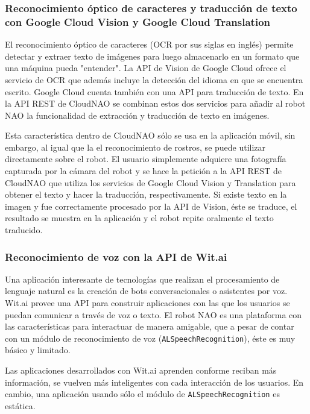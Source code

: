 \subsubsection{Reconocimiento óptico de caracteres y traducción de texto con Google Cloud Vision y Google Cloud Translation}

El reconocimiento óptico de caracteres (OCR por sus siglas en inglés) permite detectar y extraer texto de imágenes para luego
almacenarlo en un formato que una máquina pueda "entender".
La API de Vision de Google Cloud ofrece el servicio de OCR
que además incluye la detección del idioma en que se encuentra escrito.
Google Cloud cuenta también con una API para traducción de 
texto.
En la API REST de CloudNAO se combinan estos dos servicios
para añadir al robot NAO la funcionalidad de extracción y traducción de texto en imágenes. 

Esta característica dentro de CloudNAO sólo
se usa en la aplicación móvil, sin embargo, al igual que
la el reconocimiento de rostros, se puede utilizar directamente
sobre el robot. El usuario simplemente adquiere una fotografía
capturada por la cámara del robot y se hace la petición
a la API REST de CloudNAO que utiliza los servicios
de Google Cloud Vision y Translation para obtener el texto
y hacer la traducción, respectivamente.
Si existe texto en la imagen y fue correctamente procesado por
la API de Vision, éste se traduce, el resultado se muestra
en la aplicación y el robot repite oralmente
el texto traducido.

\subsubsection{Reconocimiento de voz con la API de Wit.ai}

Una aplicación interesante de tecnologías que realizan el 
procesamiento de lenguaje natural es la creación de bots conversacionales
o asistentes por voz. Wit.ai provee una API para construir aplicaciones
con las que los usuarios se puedan comunicar a través de voz o texto.
El robot NAO es una plataforma con las características 
para interactuar de manera amigable, que a pesar de contar con un
módulo de reconocimiento de voz (\texttt{ALSpeechRecognition}), éste es muy 
básico y limitado.

Las aplicaciones desarrollados con Wit.ai aprenden conforme reciban más 
información, se vuelven más inteligentes con cada interacción de los usuarios.
En cambio, una aplicación usando sólo el módulo de \texttt{ALSpeechRecognition} es estática.

